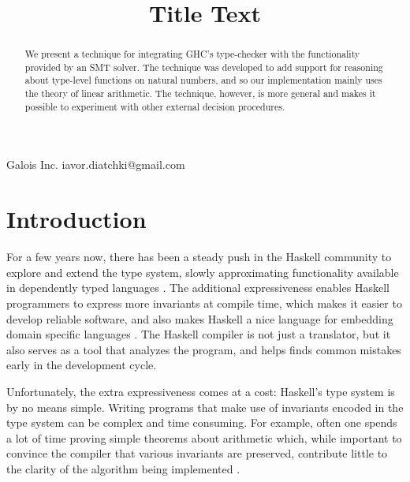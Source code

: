\documentclass{sigplanconf}
\begin{document}
\setlength{\pdfpageheight}{\paperheight}
\setlength{\pdfpagewidth}{\paperwidth}



\title{Title Text}

           {Galois Inc.}
           {iavor.diatchki@gmail.com}

\maketitle

\begin{abstract}
We present a technique for integrating GHC's type-checker with the
functionality provided by an SMT solver.  The technique was developed
to add support for reasoning about type-level functions on natural
numbers, and so our implementation mainly uses the theory of linear
arithmetic.  The technique, however, is more general and makes it
possible to experiment with other external decision procedures.
\end{abstract}


\section{Introduction}

For a few years now, there has been a steady push in the Haskell
community to explore and extend the type system, slowly approximating
functionality available in dependently typed languages
\cite{Eisenberg2012,Lindley2013,Eisenberg2014}.  The additional
expressiveness enables Haskell programmers to express more
invariants at compile time, which makes it easier to develop
reliable software, and also makes Haskell a nice language
for embedding domain specific languages \cite{ivory-experience}.
The Haskell compiler is not just a translator, but it also
serves as a tool that analyzes the program, and helps
finds common mistakes early in the development cycle.

Unfortunately, the extra expressiveness comes at a cost:
Haskell's type system is by no means simple. Writing
programs that make use of invariants encoded in the
type system can be complex and time consuming.  For
example, often one spends a lot of time proving simple theorems
about arithmetic which, while important to convince the compiler
that various invariants are preserved, contribute little to
the clarity of the algorithm being implemented \cite{Lindley2013}.
\end{document}

